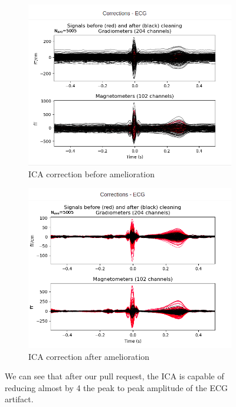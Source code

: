 \begin{figure}
    \centering
    \begin{subfigure}{.5\textwidth}
        \centering
        \includegraphics[width=1.\linewidth]{images_report/preprocessing/ica/ECG_ICA_before_PR.png}
        \caption{ICA correction before amelioration}
        \label{fig:before_ica_PR}
    \end{subfigure}%
    \begin{subfigure}{.5\textwidth}
        \centering
        \includegraphics[width=1.\linewidth]{images_report/preprocessing/ica/ECG_ICA_after_PR.png}
        \caption{ICA correction after amelioration}
        \label{fig:after_ica_PR}
    \end{subfigure}
    \caption{We can see that after our pull request, the ICA is capable of reducing almost by 4 the peak to peak amplitude of the ECG artifact.}
    \label{fig:PR_ica}
\end{figure}



